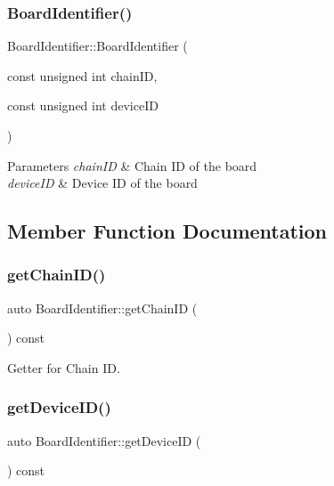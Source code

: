 \subsubsection{\texorpdfstring{Board\+Identifier()}{BoardIdentifier()}}
{\footnotesize\ttfamily Board\+Identifier\+::\+Board\+Identifier (\begin{DoxyParamCaption}\item[{const unsigned int}]{chain\+ID,  }\item[{const unsigned int}]{device\+ID }\end{DoxyParamCaption})}


\begin{DoxyParams}{Parameters}
{\em chain\+ID} & Chain ID of the board \\
\hline
{\em device\+ID} & Device ID of the board \\
\hline
\end{DoxyParams}


\subsection{Member Function Documentation}
\mbox{\label{class_board_identifier_ad909f0c1eb9f80ec177ea8526c94d011}} 
\subsubsection{\texorpdfstring{get\+Chain\+I\+D()}{getChainID()}}
{\footnotesize\ttfamily auto Board\+Identifier\+::get\+Chain\+ID (\begin{DoxyParamCaption}{ }\end{DoxyParamCaption}) const\hspace{0.3cm}{\ttfamily [inline]}}



Getter for Chain ID. 

\mbox{\label{class_board_identifier_a8f3d818c08107a42fe9305607be38a3b}} 
\subsubsection{\texorpdfstring{get\+Device\+I\+D()}{getDeviceID()}}
{\footnotesize\ttfamily auto Board\+Identifier\+::get\+Device\+ID (\begin{DoxyParamCaption}{ }\end{DoxyParamCaption}) const\hspace{0.3cm}{\ttfamily [inline]}}



